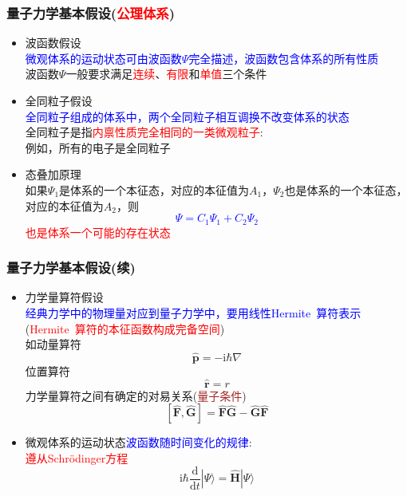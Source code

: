 \frame
{
	\frametitle{量子力学基本假设(\textcolor{red}{公理体系})}
	\begin{itemize}
		\item 波函数假设\\
			\textcolor{blue}{微观体系的运动状态可由波函数$\Psi$完全描述，波函数包含体系的所有性质}\\
			波函数$\Psi$一般要求满足\textcolor{red}{连续}、\textcolor{red}{有限}和\textcolor{red}{单值}三个条件
		\item 全同粒子假设\\
			\textcolor{blue}{全同粒子组成的体系中，两个全同粒子相互调换不改变体系的状态}\\ 
			全同粒子是指\textcolor{red}{内禀性质完全相同的一类微观粒子}:\\例如，所有的电子是全同粒子 
		\item 态叠加原理\\
			如果$\Psi_1$是体系的一个本征态，对应的本征值为$A_1$，$\Psi_2$也是体系的一个本征态，对应的本征值为$A_2$，则\textcolor{blue}{$$\Psi=C_1\Psi_1+C_2\Psi_2$$}\textcolor{red}{也是体系一个可能的存在状态}
	\end{itemize}
}

\frame
{
	\frametitle{量子力学基本假设(续)}
	\begin{itemize}
		\item 力学量算符假设\\
			\textcolor{blue}{经典力学中的物理量对应到量子力学中，要用线性\textrm{Hermite~}算符表示}(\textcolor{red}{\textrm{Hermite~}算符的本征函数构成完备空间})\\
			如动量算符 
			$$\hat{\mathbf{p}}=-\mathrm{i}\hbar\nabla$$
			位置算符$$\hat{\mathbf r}=r$$
			力学量算符之间有确定的对易关系(\textcolor{brown}{量子条件})
			$$[\hat{\mathbf F},\hat{\mathbf G}]=\hat{\mathbf F}\hat{\mathbf G}-\hat{\mathbf G}\hat{\mathbf F}$$ 
			
		\item 微观体系的运动状态\textcolor{blue}{波函数随时间变化的规律}:\\\textcolor{red}{遵从\textrm{Schr\"odinger}方程}
			$$\mathrm{i}\hbar\dfrac{\mathrm{d}}{\mathrm{d}t}|\Psi\rangle=\hat{\mathbf H}|\Psi\rangle$$
	\end{itemize}
}

